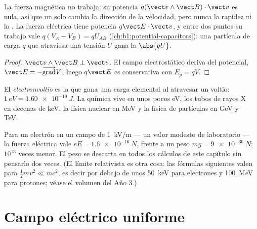 \begin{proposition}\label{prop:b1:charged-particles:work}
La fuerza magnética no trabaja: su potencia $q(\vect v\wedge\vect B)\cdot\vect v$
es nula, así que un  solo cambia la dirección de la
velocidad, pero nunca la rapidez ni la . La fuerza
eléctrica tiene potencia $q\vect E\cdot\vect v$, y entre dos puntos su
trabajo vale $q(V_A - V_B) =
qU_{AB}$ (\cref{ch:b1:potential-capacitors}): una partícula de carga $q$
que atraviesa una tensión $U$ gana la  $\abs{qU}$.
\end{proposition}

\begin{proof}
$\vect v\wedge\vect B \perp \vect v$. El campo electrostático deriva del
potencial, $\vect E = -\overrightarrow{\operatorname{grad}}V$, luego $q\vect E$
es conservativa con $E_p = qV$.
\end{proof}

\begin{definition}[El electronvoltio]\label{def:b1:charged-particles:eV}
El \emph{electronvoltio} es la  que gana una carga
elemental al atravesar un voltio: $\qty{1}{eV} = \qty{1.60e-19}{J}$. La
química vive en unos pocos eV, los tubos de rayos X en decenas de keV, la
física nuclear en MeV y la física de partículas en GeV y TeV.
\end{definition}

\begin{remark}\label{rem:b1:charged-particles:gravity}
Para un electrón en un campo de \qty{1}{kV/m} --- un valor modesto de
laboratorio --- la fuerza eléctrica vale $eE = \qty{1.6e-16}{N}$, frente a
un peso $mg = \qty{9e-30}{N}$: $10^{13}$ veces menor. El peso se descarta
en todos los cálculos de este capítulo sin pensarlo dos veces. (El límite
relativista es otra cosa: las fórmulas siguientes valen para
$\tfrac12 mv^2 \ll mc^2$, es decir por debajo de unos \qty{50}{keV} para
electrones y \qty{100}{MeV} para protones; véase el volumen del Año 3.)
\end{remark}

\section{Campo eléctrico uniforme}

